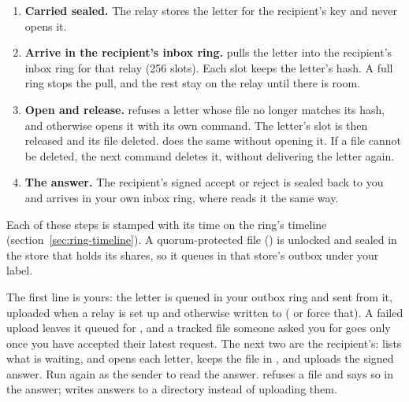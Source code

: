 \begin{enumerate}
  Sending a letter twice still makes one letter. This holds for a take-over and
  for a stalled send that finishes late. The relay keeps one copy per recipient
  and content, and answers a repeat with the same letter id. In an output
  directory the letter is written to a private  file and moved into
  place whole, never over a different file, and an identical file already there
  counts as written. Only the send that still holds the claim frees the slot,
  so the letter is counted as sent once.
  \item \textbf{Carried sealed.} The relay stores the letter for the
  recipient's key and never opens it.
  \item \textbf{Arrive in the recipient's inbox ring.}  pulls the
  letter into the recipient's inbox ring for that relay (256 slots). Each slot
  keeps the letter's hash. A full ring stops the pull, and the rest stay on the
  relay until there is room.
  \item \textbf{Open and release.}  refuses a letter whose
  file no longer matches its hash, and otherwise opens it with its own command.
  The letter's slot is then released and its file deleted. 
  does the same without opening it. If a file cannot be deleted, the next
   command deletes it, without delivering the letter again.
  \item \textbf{The answer.} The recipient's signed accept or reject is sealed
  back to you and arrives in your own inbox ring, where  reads
  it the same way.
\end{enumerate}

\noindent Each of these steps is stamped with its time on the ring's timeline
(section~\ref{sec:ring-timeline}). A quorum-protected file
() is unlocked and sealed in the store that holds its
shares, so it queues in that store's outbox under your label.

The first line is yours: the letter is queued in your outbox ring and sent from
it, uploaded when a relay is set up and otherwise written to 
( or  force that). A failed upload leaves it
queued for , and a tracked file someone asked you for goes
only once you have accepted their latest request. The next two are the recipient's:  lists what is
waiting, and  opens each letter, keeps the file in
, and uploads the signed answer. Run  again as
the sender to read the answer.  refuses a file and says so in the
answer;  writes answers to a directory instead of uploading them.

